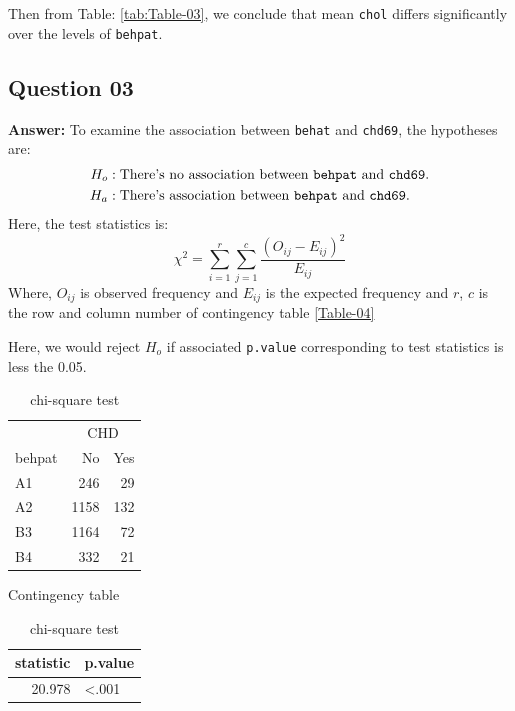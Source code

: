 \documentclass[
  12pt,
  oneside]{article}
\begin{document}
Then from Table: \ref{tab:Table-03}, we conclude that mean \texttt{chol} differs significantly over the levels of \texttt{behpat}.

\clearpage

\hypertarget{question-03}{%
\subsection{Question 03}\label{question-03}}

\textbf{Answer:} To examine the association between \texttt{behat} and \texttt{chd69}, the hypotheses are:
\begin{align*}
H_o&: \text{There's no association between \texttt{behpat} and \texttt{chd69}.} \\
H_a&: \text{There's association between \texttt{behpat} and \texttt{chd69}.}
\end{align*}
Here, the test statistics is:
\[
\chi^2 = \sum_{i=1}^{r}\sum_{j=1}^{c}\frac{(O_{ij} - E_{ij})^2}{E_{ij}}
\]
Where, \(O_{ij}\) is observed frequency and \(E_{ij}\) is the expected frequency and \(r\), \(c\) is the row and column number of contingency table \ref{Table-04}

Here, we would reject \(H_o\) if associated \texttt{p.value} corresponding to test statistics
is less the 0.05.

\begin{table}[H]
      \begin{minipage}{.5\linewidth}
      \centering
\begin{tabular}{lrr}
\toprule
\multicolumn{1}{c}{ } & \multicolumn{2}{c}{CHD} \\
\cmidrule(l{3pt}r{3pt}){2-3}
behpat & No & Yes\\
\midrule
A1 & 246 & 29\\
A2 & 1158 & 132\\
B3 & 1164 & 72\\
B4 & 332 & 21\\
\bottomrule
\end{tabular}\caption{Contingency table}
      \label{Table-04}
    \end{minipage}%
      \begin{minipage}{.5\linewidth}
        \centering
\begin{tabular}{rl}
\toprule
statistic & p.value\\
\midrule
20.978 & <.001\\
\bottomrule
\end{tabular}\caption{chi-square test}
    \label{Table-05}
    \end{minipage}
      \end{table}
\end{document}
